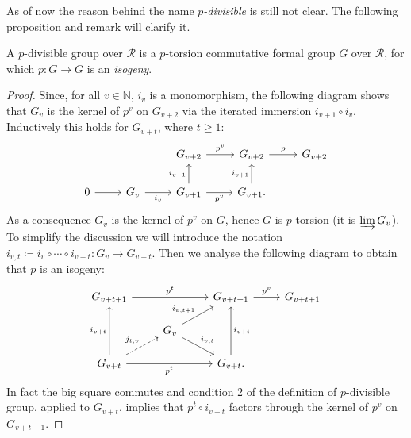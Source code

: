 \noindent
As of now the reason behind the name \emph{\(p\)-divisible} is still not clear.
The following proposition and remark will clarify it.
\begin{prop}\label{CharactpDivGroups}%
	A $p$-divisible group over $\mathscr{R}$ is a $p$-torsion
	commutative formal group $G$ over $\mathscr{R}$,
	for which $p\colon G \to G$ is an \emph{isogeny}.
\end{prop}
\begin{proof}
	Since, for all \(v \in \mathbb{N}\), \(i_v\) is a monomorphism,
	the following diagram shows that $G_v$ is the kernel of $p^v$
	on $G_{v+2}$ via the iterated immersion $i_{v+1} \circ i_v$.
	Inductively this holds for $G_{v+t}$, where $t \geq 1$:
	\begin{equation*}
	\begin{tikzcd}
		&
		&
		G_{v+2} \arrow[r, "p^v", rightarrow] &
		G_{v+2} \arrow[r, "p", rightarrow] &
		G_{v+2}\\
		0 \arrow[r, "", rightarrow] &
		G_{v} \arrow[r, "i_v"', rightarrow] &
		G_{v+1} \arrow[r, "p^v"', rightarrow] 
		\arrow[u, "i_{v+1}", rightarrow] &
		G_{v+1}. \arrow[u, "i_{v+1}", rightarrow] &
	\end{tikzcd}
	\end{equation*}
	As a consequence $G_v$ is the kernel of $p^v$ on $G$,
	hence $G$ is $p$-torsion (it is $\varinjlim G_v$).
	To simplify the discussion we will introduce the notation
	$i_{v,t} \coloneqq i_v \circ \cdots \circ i_{v+t}\colon G_v \to G_{v + t}$.
	Then we analyse the following diagram to obtain that $p$
	is an isogeny:
	\begin{equation}\label{diag:pDivCharProof}
	\begin{tikzcd}[row sep=1.4em]
		G_{v+t+1} \arrow[rr, "p^t", rightarrow] & &
		G_{v+t+1} \arrow[r, "p^v", rightarrow] &
		G_{v+t+1}\\
		&
		G_v \arrow[ru, "i_{v,t+1}", rightarrow] 
		\arrow[rd, "i_{v,t}", rightarrow] 
		& & \\
		G_{v+t} \arrow[ru, "j_{t,v}", dashrightarrow] 
		\arrow[rr, "p^t"', rightarrow]
		\arrow[uu, "i_{v+t}", rightarrow] & &
		G_{v+t} \arrow[uu, "i_{v+t}"', rightarrow]
	.\end{tikzcd}
	\end{equation}
	In fact the big square commutes and condition 2 of the definition
	of $p$-divisible group, applied to $G_{v+t}$, implies that $p^t \circ i_{v+t}$
	factors through the kernel of $p^v$ on $G_{v+t+1}$.

\end{proof}
